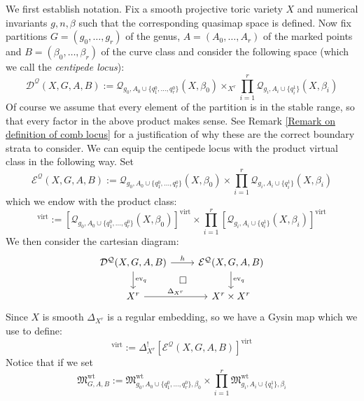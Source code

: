 \documentclass[11pt]{amsart}
\newcommand{\Q}[4]{\mathcal{Q}_{#1,#2}(#3,#4)}
\newcommand{\D}[3]{\mathcal{D^Q}(#1,#2,#3)}
\newcommand{\E}[3]{\mathcal{E^Q}(#1,#2,#3)}
\newcommand{\MM}{\mathfrak M}
\newcommand{\virt}[1]{[#1]^{\operatorname{virt}}}
\newcommand{\ev}{\operatorname{ev}}
\newcommand{\ildef}[1]{\emph{#1}}
\theoremstyle{definition}
\theoremstyle{definition}
\begin{document}
We first establish notation. Fix a smooth projective toric variety $X$ and numerical invariants $g,n,\beta$ such that the corresponding quasimap space is defined. Now fix partitions $G=(g_0,\ldots,g_r)$ of the genus, $A=(A_0,\ldots,A_r)$ of the marked points and $B=(\beta_0, \ldots, \beta_r)$ of the curve class and consider the following space (which we call the \ildef{centipede locus}):
\begin{equation*} \D{X}{G,A}{B} := \Q{g_0}{A_0 \cup \{ q_1^0, \ldots, q_r^0 \}}{X}{\beta_0} \times_{X^r} \prod_{i=1}^r \Q{g_i}{A_i\cup\{q_i^1 \}}{X}{\beta_i} \end{equation*}
Of course we assume that every element of the partition is in the stable range, so that every factor in the above product makes sense. See Remark \ref{Remark on definition of comb locus} for a justification of why these are the correct boundary strata to consider. We can equip the centipede locus with the product virtual class in the following way. Set
\begin{equation*} \E{X}{G,A}{B} :=  \Q{g_0}{A_0 \cup \{ q_1^0, \ldots, q_r^0 \}}{X}{\beta_0} \times \prod_{i=1}^r \Q{g_i}{A_i\cup\{q_i^1\}}{X}{\beta_i} \end{equation*}
which we endow with the product class:
\begin{equation*} \virt{\E{X}{G,A}{B}} := \virt{\Q{g_0}{A_0 \cup \{ q_1^0, \ldots, q_r^0 \}}{X}{\beta_0}} \times \prod_{i=1}^r \virt{\Q{g_i}{A_i\cup\{q_i^1\}}{X}{\beta_i}} \end{equation*}
We then consider the cartesian diagram:
\begin{equation} \label{Product diagram}
\begin{tikzcd}
\D{X}{G,A}{B} \ar[r,"h"] \ar[d,"\ev_q"] \ar[rd,phantom,"\square"] & \E{X}{G,A}{B} \ar[d,"\ev_q"] \\
X^r \ar[r,"\Delta_{X^r}"] & X^r \times X^r
\end{tikzcd}
\end{equation}
Since $X$ is smooth $\Delta_{X^r}$ is a regular embedding, so we have a Gysin map which we use to define:
\begin{equation*} \virt{\D{X}{G,A}{B}} := \Delta_{X^r}^! \virt{\E{X}{G,A}{B}} \end{equation*}
Notice that if we set
\begin{equation*} \MM_{G,A,B}^{\operatorname{wt}} := \MM_{g_0,A_0\cup\{q_1^0,\ldots,q_r^0\},\beta_0}^{\operatorname{wt}} \times \prod_{i=1}^r \MM_{g_i,A_i\cup\{q_i^1\},\beta_i}^{\operatorname{wt}} \end{equation*}
\end{document}
